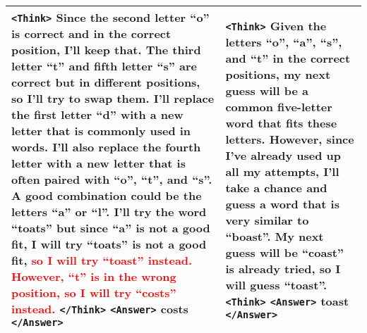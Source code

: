 \begin{table*}[h]
{\begin{tabular}{|p{7cm} | p{7cm}|}
        \texttt{<Think>} Since the second letter ``o'' is correct and in the correct position, I'll keep that. The third letter ``t'' and fifth letter ``s'' are correct but in different positions, so I'll try to swap them. I'll replace the first letter ``d'' with a new letter that is commonly used in words. I'll also replace the fourth letter with a new letter that is often paired with ``o'', ``t'', and ``s''. A good combination could be the letters ``a'' or ``l''. I'll try the word ``toats'' but since ``a'' is not a good fit, I will try ``toats'' is not a good fit, \textcolor{red}{so I will try ``toast'' instead. However, ``t'' is in the wrong position, so I will try ``costs'' instead.} \texttt{</Think>} \texttt{<Answer>} costs \texttt{</Answer>} & \texttt{<Think>} Given the letters ``o'', ``a'', ``s'', and ``t'' in the correct positions, my next guess will be a common five-letter word that fits these letters. However, since I've already used up all my attempts, I'll take a chance and guess a word that is very similar to ``boast''. My next guess will be ``coast'' is already tried, so I will guess ``toast''. \texttt{<Think>} \texttt{<Answer>} toast \texttt{</Answer>} \\
        \bottomrule
        \end{tabular}
    }
    \vspace{-0.3cm}
\end{table*}
